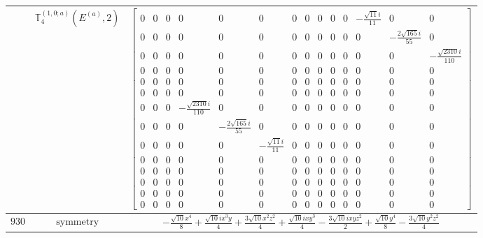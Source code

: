 \documentclass[fleqn,8pt,landscape]{jsarticle}
\begin{document}
\begin{longtable}{ccc}
$  $ & $ \mathbb{T}_{4}^{(1,0;a)}(E^{(a)},2) $ & $ \begin{bmatrix} 0 & 0 & 0 & 0 & 0 & 0 & 0 & 0 & 0 & 0 & 0 & - \frac{\sqrt{11} i}{11} & 0 & 0 \\ 0 & 0 & 0 & 0 & 0 & 0 & 0 & 0 & 0 & 0 & 0 & 0 & - \frac{2 \sqrt{165} i}{55} & 0 \\ 0 & 0 & 0 & 0 & 0 & 0 & 0 & 0 & 0 & 0 & 0 & 0 & 0 & - \frac{\sqrt{2310} i}{110} \\ 0 & 0 & 0 & 0 & 0 & 0 & 0 & 0 & 0 & 0 & 0 & 0 & 0 & 0 \\ 0 & 0 & 0 & 0 & 0 & 0 & 0 & 0 & 0 & 0 & 0 & 0 & 0 & 0 \\ 0 & 0 & 0 & 0 & 0 & 0 & 0 & 0 & 0 & 0 & 0 & 0 & 0 & 0 \\ 0 & 0 & 0 & - \frac{\sqrt{2310} i}{110} & 0 & 0 & 0 & 0 & 0 & 0 & 0 & 0 & 0 & 0 \\ 0 & 0 & 0 & 0 & - \frac{2 \sqrt{165} i}{55} & 0 & 0 & 0 & 0 & 0 & 0 & 0 & 0 & 0 \\ 0 & 0 & 0 & 0 & 0 & - \frac{\sqrt{11} i}{11} & 0 & 0 & 0 & 0 & 0 & 0 & 0 & 0 \\ 0 & 0 & 0 & 0 & 0 & 0 & 0 & 0 & 0 & 0 & 0 & 0 & 0 & 0 \\ 0 & 0 & 0 & 0 & 0 & 0 & 0 & 0 & 0 & 0 & 0 & 0 & 0 & 0 \\ 0 & 0 & 0 & 0 & 0 & 0 & 0 & 0 & 0 & 0 & 0 & 0 & 0 & 0 \\ 0 & 0 & 0 & 0 & 0 & 0 & 0 & 0 & 0 & 0 & 0 & 0 & 0 & 0 \\ 0 & 0 & 0 & 0 & 0 & 0 & 0 & 0 & 0 & 0 & 0 & 0 & 0 & 0 \end{bmatrix} $ \\ \hline
$ 930 $ & $ \text{symmetry} $ & $ - \frac{\sqrt{10} x^{4}}{8} + \frac{\sqrt{10} i x^{3} y}{4} + \frac{3 \sqrt{10} x^{2} z^{2}}{4} + \frac{\sqrt{10} i x y^{3}}{4} - \frac{3 \sqrt{10} i x y z^{2}}{2} + \frac{\sqrt{10} y^{4}}{8} - \frac{3 \sqrt{10} y^{2} z^{2}}{4} $ \\

\end{longtable}
\end{document}
